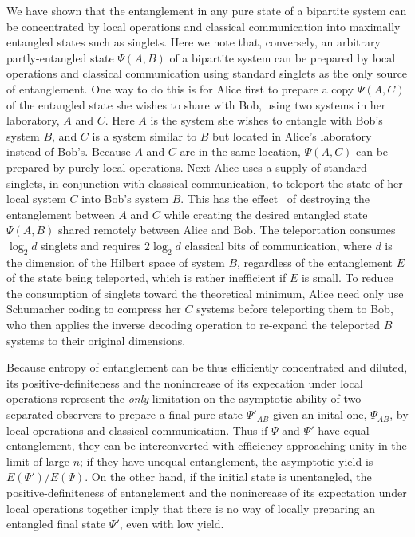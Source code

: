  
We have shown that the entanglement in any pure state of a bipartite
system can be concentrated by local operations and classical
communication into maximally entangled states such as singlets. Here we
note that, conversely, an arbitrary partly-entangled state $\Psi(A,B)$
of a bipartite system can be prepared by local operations and classical
communication using standard singlets as the only source of
entanglement. One way to do this is for Alice first to prepare a copy
$\Psi(A,C)$ of the entangled state she wishes to share with Bob, using
two systems in her laboratory, $A$ and $C$.  Here $A$ is the system she
wishes to entangle with Bob's system $B$, and $C$ is a system similar to
$B$ but located in Alice's laboratory instead of Bob's.  Because $A$ and
$C$ are in the same location, $\Psi(A,C)$ can be prepared by purely
local operations.  Next Alice uses a supply of standard singlets, in
conjunction with classical communication, to teleport the state of her
local system $C$ into Bob's system $B$. This has the
effect~\cite{BBCJPW93} of destroying the entanglement between $A$ and
$C$ while creating the desired entangled state $\Psi(A,B)$ shared
remotely between Alice and Bob.  The teleportation consumes $\log_2d$
singlets and requires $2\log_2d$ classical bits of communication, where
$d$ is the dimension of the Hilbert space of system $B$, regardless of
the entanglement $E$ of the state being teleported, which is rather
inefficient if $E$ is small. To reduce the consumption of singlets
toward the theoretical minimum, Alice need only use Schumacher coding to
compress her $C$ systems before teleporting them to Bob, who then
applies the inverse decoding operation to re-expand the teleported $B$
systems to their original dimensions.
 
Because entropy of entanglement can be thus efficiently concentrated and
diluted, its positive-definiteness and the nonincrease of its expecation
under local operations represent the {\em only\/} limitation on the
asymptotic ability of two separated observers to prepare a final pure
state $\Psi'_{AB}$ given an inital one, $\Psi_{AB}$, by local operations
and classical communication.  Thus if $\Psi$ and $\Psi'$ have equal
entanglement, they can be interconverted with efficiency approaching
unity in the limit of large $n$; if they have unequal entanglement, the
asymptotic yield is $E(\Psi')/E(\Psi)$.  On the other hand, if the
initial state is unentangled, the positive-definiteness of entanglement
and the nonincrease of its expectation under local operations together
imply that there is no way of locally preparing an entangled final state
$\Psi'$, even with low yield.
 
